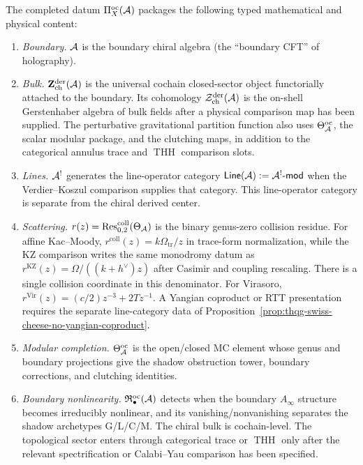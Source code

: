 \begin{remark}
\label{rem:thqg-completed-datum-captures}
The completed datum $\Pi^{\mathrm{oc}}_X(\mathcal{A})$ packages the
following typed mathematical and physical content:
\begin{enumerate}[label=\textup{(\alph*)}]
\item \emph{Boundary.} $\mathcal{A}$ is the boundary chiral algebra
 (the ``boundary CFT'' of holography).
\item \emph{Bulk.}
 $\mathbf{Z}^{\mathrm{der}}_{\mathrm{ch}}(\mathcal{A})$ is the
 universal cochain closed-sector object functorially attached to
 the boundary. Its cohomology
 $\mathcal{Z}^{\mathrm{der}}_{\mathrm{ch}}(\mathcal{A})$ is the on-shell
 Gerstenhaber algebra of bulk fields after a physical comparison map
 has been supplied. The perturbative gravitational partition
function also uses
$\Theta^{\mathrm{oc}}_{\mathcal{A}}$, the scalar modular package, and the
clutching maps, in addition to the categorical annulus trace and
$\operatorname{THH}$ comparison slots.
\item \emph{Lines.}
 $\mathcal{A}^!$ generates the line-operator category
 $\mathsf{Line}(\mathcal{A}):=\mathcal{A}^!\text{-}\mathsf{mod}$ when the
 Verdier--Koszul comparison supplies that category. This
 line-operator category is separate from the chiral derived center.
\item \emph{Scattering.}
 $r(z)=\operatorname{Res}^{\mathrm{coll}}_{0,2}(\Theta_{\mathcal{A}})$ is the
 binary genus-zero collision residue. For affine Kac--Moody,
 $r^{\mathrm{coll}}(z)=k\Omega_{\mathrm{tr}}/z$ in trace-form
 normalization, while the KZ comparison writes the same monodromy
 datum as
 $r^{\mathrm{KZ}}(z)=\Omega/((k+h^\vee)z)$ after
 Casimir and coupling rescaling. There is a single collision
 coordinate in this denominator. For Virasoro,
 $r^{\mathrm{Vir}}(z)=(c/2)z^{-3}+2Tz^{-1}$.
 A Yangian coproduct or RTT presentation requires the separate
 line-category data of
 Proposition~\ref{prop:thqg-swiss-cheese-no-yangian-coproduct}.
\item \emph{Modular completion.}
 $\Theta^{\mathrm{oc}}_{\mathcal{A}}$ is the open/closed MC element whose
 genus and boundary projections give the shadow obstruction tower,
 boundary corrections, and clutching identities.
\item \emph{Boundary nonlinearity.}
 $\mathfrak{R}^{\mathrm{oc}}_\bullet(\mathcal{A})$ detects when the
 boundary $A_\infty$ structure becomes irreducibly nonlinear, and
 its vanishing/nonvanishing separates the shadow archetypes
 G/L/C/M. The chiral bulk is cochain-level. The topological sector
 enters through categorical trace or $\operatorname{THH}$ only after
 the relevant spectrification or Calabi--Yau comparison has been
 specified.
\end{enumerate}
\end{remark}

